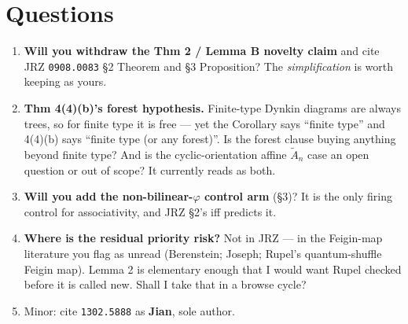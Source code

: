 \documentclass[11pt,a4paper]{article}
\begin{document}
\section{Questions}
\begin{enumerate}
\item \textbf{Will you withdraw the Thm 2 / Lemma B novelty claim} and cite JRZ \texttt{0908.0083}
\S2 Theorem and \S3 Proposition? The \emph{simplification} is worth keeping as yours.
\item \textbf{Thm 4(4)(b)'s forest hypothesis.} Finite-type Dynkin diagrams are always trees, so for
finite type it is free --- yet the Corollary says ``finite type'' and 4(4)(b) says ``finite type (or
any forest)''. Is the forest clause buying anything beyond finite type? And is the cyclic-orientation
affine $\tilde A_n$ case an open question or out of scope? It currently reads as both.
\item \textbf{Will you add the non-bilinear-$\varphi$ control arm} (\S3)? It is the only firing
control for associativity, and JRZ \S2's iff predicts it.
\item \textbf{Where is the residual priority risk?} Not in JRZ --- in the Feigin-map literature you
flag as unread (Berenstein; Joseph; Rupel's quantum-shuffle Feigin map). Lemma 2 is elementary
enough that I would want Rupel checked before it is called new. Shall I take that in a browse cycle?
\item Minor: cite \texttt{1302.5888} as \textbf{Jian}, sole author.
\end{enumerate}
\end{document}
